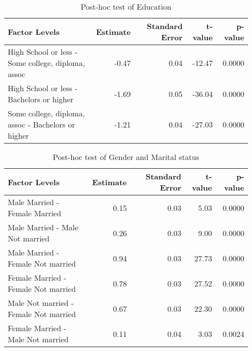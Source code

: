 \begin{table}[H]
\footnotesize
\centering
\caption{Post-hoc test of Education} 
\begin{tabular}{lrrrr}
  \hline
Factor Levels & Estimate & Standard Error & t-value & p-value \\ 
  \hline
 High School or less - Some college, diploma, assoc & -0.47 & 0.04 & -12.47 & 0.0000 \\ 
   High School or less - Bachelors or higher & -1.69 & 0.05 & -36.04 & 0.0000 \\ 
   Some college, diploma, assoc - Bachelors or higher & -1.21 & 0.04 & -27.03 & 0.0000 \\ 
   \hline
\end{tabular}
\label{tab:education}
\end{table}

\begin{table}[H]
\footnotesize
\centering
\caption{Post-hoc test of Gender and Marital status} 
\begin{tabular}{lrrrr}
  \hline
Factor Levels & Estimate & Standard Error & t-value & p-value \\ 
  \hline
  Male Married -  Female Married & 0.15 & 0.03 & 5.03 & 0.0000 \\ 
    Male Married -  Male Not married & 0.26 & 0.03 & 9.00 & 0.0000 \\ 
    Male Married -  Female Not married & 0.94 & 0.03 & 27.73 & 0.0000 \\ 
    Female Married -  Female Not married & 0.78 & 0.03 & 27.52 & 0.0000 \\ 
    Male Not married -  Female Not married & 0.67 & 0.03 & 22.30 & 0.0000 \\ 
    Female Married -  Male Not married & 0.11 & 0.04 & 3.03 & 0.0024 \\ 
   \hline
\end{tabular}
\label{tab:gender_ms}
\end{table}

